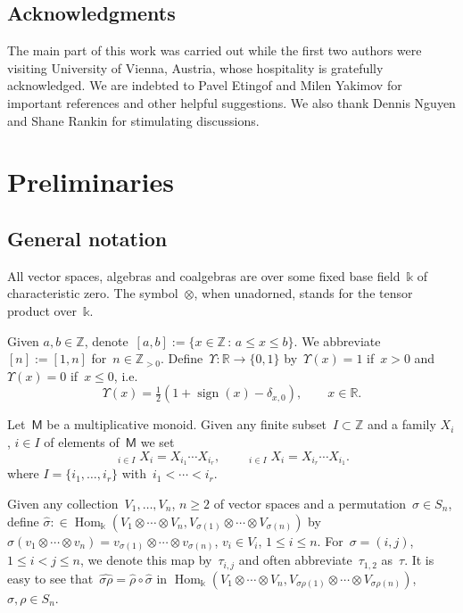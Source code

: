 \documentclass[12pt, reqno]{amsart}
\theoremstyle{definition}
\newcommand{\ascprod}{\mathop{\overrightarrow{\prod}}}
\newcommand{\dscprod}{\mathop{\overleftarrow{\prod}}}
\numberwithin{equation}{section}
\newcommand{\tensor}{\otimes}
\newcommand{\kk}{\mathbb{k}}\newcommand{\lie}[1]{{\mathfrak{#1}}}
\newcommand{\ZZ}{{\mathbb Z}}
\DeclareMathOperator{\Hom}{Hom}
\DeclareMathOperator{\sign}{sign}
\begin{document}
\subsection*{Acknowledgments}
The main part of this work was carried out while
the first two authors were visiting University of Vienna, Austria, whose hospitality is gratefully acknowledged.
We are indebted to Pavel Etingof and Milen Yakimov for  important references and other helpful suggestions.
We also thank Dennis Nguyen and Shane Rankin for stimulating discussions. 

\section{Preliminaries}

\subsection{General notation}
All vector spaces, algebras and coalgebras are over some fixed base field~$\kk$ of characteristic zero. The symbol~$\tensor$, when unadorned, stands for the tensor product over~$\kk$.

Given $a,b\in \mathbb Z$, denote~$[a,b]:=\{x\in\ZZ\,:\,a\le x\le b\}$. We abbreviate
$[n]:=[1,n]$ for~$n\in\ZZ_{>0}$.
Define~$\Upsilon:\mathbb R\to \{0,1\}$ by~$\Upsilon(x)=1$
if~$x>0$ and~$\Upsilon(x)=0$ if~$x\le 0$, i.e.
\begin{equation}\label{eq:Ups formula}
\Upsilon(x)=\tfrac12(1+\sign(x)-\delta_{x,0}),\qquad x\in\mathbb R. 
\end{equation}

Let~$\mathsf M$ be a multiplicative monoid. 
Given any finite subset~$I\subset \ZZ$ and
a family $X_i$, $i\in I$ of elements of~$\mathsf M$ we set
$$
\ascprod_{i\in I} X_i=X_{i_1}\cdots X_{i_r},\qquad
\dscprod_{i\in I} X_i=X_{i_r}\cdots X_{i_1}.
$$
where $I=\{i_1,\dots,i_r\}$ with~$i_1<\cdots<i_r$. 

Given any collection~$V_1,\dots,V_n$, $n\ge2$ of vector spaces
and a permutation~$\sigma\in S_n$, define $\widehat\sigma:
\in\Hom_\kk(V_1\tensor\cdots\tensor V_n, V_{\sigma(1)}\tensor\cdots\tensor V_{\sigma(n)})$
by~$\widehat\sigma(v_1\tensor \cdots\tensor v_n)=
v_{\sigma(1)}\tensor\cdots\tensor v_{\sigma(n)}$, $v_i\in V_i$, $1\le i\le n$.
For~$\sigma=(i,j)$, $1\le i<j\le n$, we denote this map by~$\tau_{i,j}$ and often abbreviate~$\tau_{1,2}$ as~$\tau$. 
It is easy to see that~$\widehat{\sigma\rho}=\widehat{\rho}\circ\widehat{\sigma}$
in $\Hom_\kk(V_1\tensor\cdots\tensor V_n,V_{\sigma\rho(1)}\tensor\cdots\tensor V_{\sigma\rho(n)})$, $\sigma,\rho\in S_n$.
\end{document}
